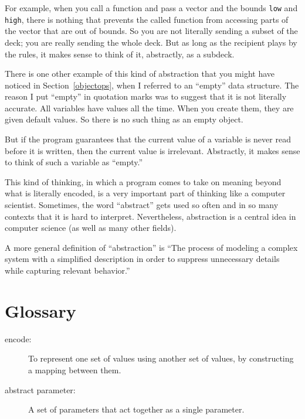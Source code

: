 For example, when you call a function and pass a vector and the bounds
{\tt low} and {\tt high}, there is nothing that prevents the called
function from accessing parts of the vector that are out of bounds.  So
you are not literally sending a subset of the deck; you are really
sending the whole deck.  But as long as the recipient plays by the
rules, it makes sense to think of it, abstractly, as a subdeck.

There is one other example of this kind of abstraction that you might
have noticed in Section~\ref{objectops}, when I referred to an
``empty'' data structure.  The reason I put ``empty'' in quotation
marks was to suggest that it is not literally accurate.  All variables
have values all the time.  When you create them, they are given
default values.  So there is no such thing as an empty object.

But if the program guarantees that the current value of a variable is
never read before it is written, then the current value is irrelevant.
Abstractly, it makes sense to think of such a variable as ``empty.''

This kind of thinking, in which a program comes to take on meaning
beyond what is literally encoded, is a very important part of thinking
like a computer scientist.  Sometimes, the word ``abstract'' gets used
so often and in so many contexts that it is hard to interpret.
Nevertheless, abstraction is a central idea in computer science (as
well as many other fields).


A more general definition of ``abstraction'' is ``The process of
modeling a complex system with a simplified description in order to
suppress unnecessary details while capturing relevant behavior.''

\section{Glossary}

\begin{description}

\item[encode:]  To represent one set of values using another
set of values, by constructing a mapping between them.

\item[abstract parameter:]  A set of parameters that act together
as a single parameter.


\end{description}


